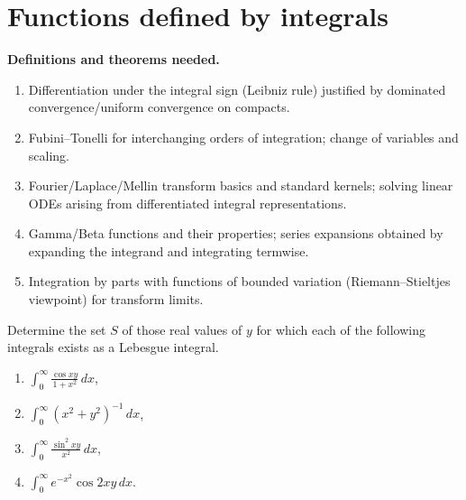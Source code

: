 \section{Functions defined by integrals}

\noindent\textbf{Definitions and theorems needed.}
\begin{enumerate}[label=(\alph*)]
    \item Differentiation under the integral sign (Leibniz rule) justified by dominated convergence/uniform convergence on compacts.
    \item Fubini–Tonelli for interchanging orders of integration; change of variables and scaling.
    \item Fourier/Laplace/Mellin transform basics and standard kernels; solving linear ODEs arising from differentiated integral representations.
    \item Gamma/Beta functions and their properties; series expansions obtained by expanding the integrand and integrating termwise.
    \item Integration by parts with functions of bounded variation (Riemann–Stieltjes viewpoint) for transform limits.
\end{enumerate}



\begin{problembox}
Determine the set $S$ of those real values of $y$ for which each of the following integrals exists as a Lebesgue integral.
\begin{enumerate}[label=(\alph*)]
    \item $\int_{0}^{\infty} \frac{\cos xy}{1 + x^2} \, dx$,
    \item $\int_{0}^{\infty} (x^2 + y^2)^{-1} \, dx$,
    \item $\int_{0}^{\infty} \frac{\sin^2 xy}{x^2} \, dx$,
    \item $\int_{0}^{\infty} e^{-x^2} \cos 2xy \, dx.$
\end{enumerate}
\end{problembox}

